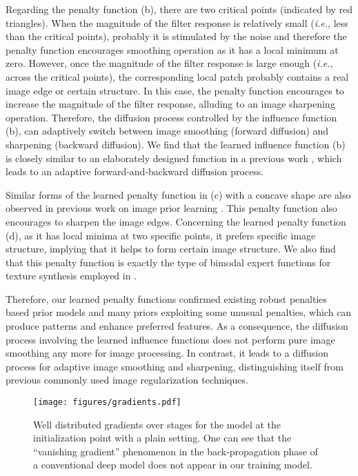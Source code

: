 \documentclass[10pt,journal,compsoc]{IEEEtran}
\newcommand{\ie}{\emph{i.e.}}
\begin{document}
Regarding the penalty function (b), there are two critical points (indicated by red triangles). When the magnitude of the 
filter response is relatively small (\ie, less than the critical points), 
probably it is stimulated by the noise and therefore the penalty function encourages 
smoothing operation as it has a local minimum at zero. However, once the magnitude of the filter response is large enough 
(\ie, across the critical points), the corresponding local patch probably contains a real image edge or certain structure. 
In this case, the penalty function encourages to increase the magnitude of the filter response, alluding to an image sharpening 
operation. Therefore, the diffusion process controlled by the influence function (b), can adaptively switch between 
image smoothing (forward diffusion) and sharpening (backward diffusion). We find that the learned influence function (b) is closely 
similar to an elaborately designed function in a previous work \cite{gilboa2002forward}, 
which leads to an adaptive forward-and-backward diffusion process. 

Similar forms of the learned penalty function in (c) with a concave shape 
are also observed in previous work on image prior learning \cite{zhu1997prior}. This penalty function also encourages to 
sharpen the image edges. Concerning the learned penalty function (d), as it has local minima at two specific points, it 
prefers specific image structure, implying that it helps to form certain image structure. We also find that this penalty function is 
exactly the type of bimodal expert functions for texture synthesis employed in \cite{HeessWH09}. 

{Therefore, our learned penalty functions confirmed existing robust penalties based 
prior models and many priors exploiting some unusual penalties, which  
can produce patterns and enhance preferred features.} 
As a consequence, the diffusion process involving the learned 
influence functions does not perform 
pure image smoothing any more for image processing. 
In contrast, it leads to a diffusion process for adaptive image smoothing 
and sharpening, distinguishing itself from previous commonly used image regularization techniques. 

\begin{figure*}[t!]
\centering
\hspace*{-1.5cm} {\texttt{[image: figures/gradients.pdf]}}
\vspace*{-0.25cm}
\caption{Well distributed gradients  
over stages for the  model at the initialization point  with a plain setting. 
{One can see that the ``vanishing gradient'' phenomenon 
\cite{bengio1994learning} in the back-propagation phase 
of a conventional deep model does not appear in our training 
model.}}\label{fig:gradients}
\end{figure*}
\end{document}
